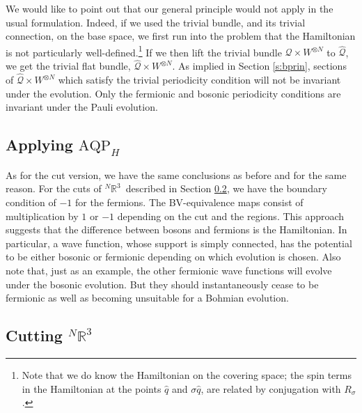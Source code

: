 \documentclass[11pt]{article}
\theoremstyle{remark}
\begin{document}
We would like to point out that our general principle would not apply
in the usual formulation. Indeed, if we used the trivial bundle, and
its trivial connection, on the
base space, we first run into the problem that the Hamiltonian is not
particularly well-defined.\footnote{Note that we
do know the Hamiltonian on the covering space; the spin terms in the
Hamiltonian at the points $\ensuremath{\hat{q}}$ and $\ensuremath{\sigma} \ensuremath{\hat{q}}$,  are related by
conjugation with \ensuremath{R_{{\ensuremath{\sigma}}}}. 
} 
If we then lift the
trivial bundle  $\ensuremath{\mathcal{Q}} \times \ensuremath{{\ensuremath{W}}^{{\otimes}{N}}}$ to \ensuremath{\widehat{\ensuremath{\mathcal{Q}}}}, 
we get the trivial flat bundle,
$\ensuremath{\widehat{\ensuremath{\mathcal{Q}}}}\times \ensuremath{{\ensuremath{W}}^{{\otimes}{N}}}$. As implied
in Section {\ref{s:bprin}}, sections of $\ensuremath{\widehat{\ensuremath{\mathcal{Q}}}} \times \ensuremath{{\ensuremath{W}}^{{\otimes}{N}}}$
  which satisfy the trivial periodicity
condition will not be
invariant under the evolution. 
Only the fermionic and bosonic periodicity conditions are invariant
under the Pauli evolution. 

\subsection{Applying \ensuremath{\text{AQP}_{H}}} 


As for the cut version, we have the same conclusions as before and for
the same reason. For the cuts of \ensuremath{{}^N\ensuremath{\mathbb{R}^{\ensuremath{3}}}}\ described in
Section {\ref{s:cutnrd}}, we have the 
boundary condition of $-1$ for the fermions. The BV-equivalence maps
consist of multiplication by $1$ or $-1$ depending on the cut and the
regions. This approach suggests that the difference
between bosons and fermions is the Hamiltonian. In particular, a wave function,
whose support is simply connected, has the potential to be either
bosonic or fermionic depending on which evolution is
chosen. Also note that, just as an example, the  other fermionic wave functions will
evolve under the bosonic evolution.  
But  they  
 should instantaneously cease to be fermionic as well as becoming
 unsuitable for a Bohmian evolution.

\subsection{Cutting \ensuremath{{}^N\ensuremath{\mathbb{R}^{\ensuremath{3}}}}} \label{s:cutnrd}
\end{document}
